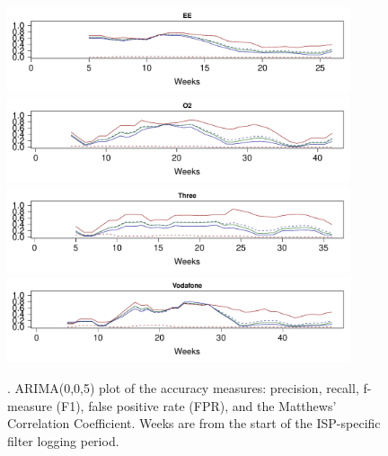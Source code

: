 \documentclass{bmcart}
\begin{document}
\begin{figure}[h!]
\caption{. ARIMA(0,0,5) plot of the accuracy measures: precision, recall, f-measure (F1), false positive rate (FPR), and the Matthews' Correlation Coefficient. Weeks are from the start of the ISP-specific filter logging period.}
\includegraphics[width=0.9\textwidth]{imgs/EE-ts-accuracy}
\includegraphics[width=0.9\textwidth]{imgs/O2-ts-accuracy}
\includegraphics[width=0.9\textwidth]{imgs/Three-ts-accuracy}
\includegraphics[width=0.9\textwidth]{imgs/Vodafone-ts-accuracy}
\label{fig:mobile-accuracy-ts}
\end{figure}

\end{document}
